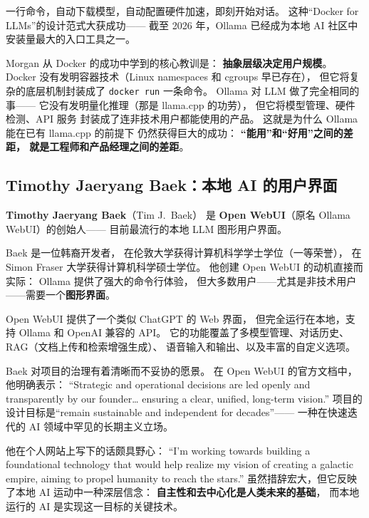 一行命令，自动下载模型，自动配置硬件加速，即刻开始对话。
这种``Docker for LLMs''的设计范式大获成功——
截至 2026 年，Ollama 已经成为本地 AI 社区中
安装量最大的入口工具之一。

\begin{whybox}
Morgan 从 Docker 的成功中学到的核心教训是：
\textbf{抽象层级决定用户规模}。
Docker 没有发明容器技术（Linux namespaces 和 cgroups 早已存在），
但它将复杂的底层机制封装成了 \texttt{docker run} 一条命令。
Ollama 对 LLM 做了完全相同的事——
它没有发明量化推理（那是 llama.cpp 的功劳），
但它将模型管理、硬件检测、API 服务
封装成了连非技术用户都能使用的产品。
这就是为什么 Ollama 能在已有 llama.cpp 的前提下
仍然获得巨大的成功：
\textbf{``能用''和``好用''之间的差距，
就是工程师和产品经理之间的差距}。
\end{whybox}


\subsection{Timothy Jaeryang Baek：本地 AI 的用户界面}
\label{subsec:baek}

\textbf{Timothy Jaeryang Baek}（Tim J.\ Baek）
是 \textbf{Open WebUI}（原名 Ollama WebUI）的创始人——
目前最流行的本地 LLM 图形用户界面。

Baek 是一位韩裔开发者，
在伦敦大学获得计算机科学学士学位（一等荣誉），
在 Simon Fraser 大学获得计算机科学硕士学位。
他创建 Open WebUI 的动机直接而实际：
Ollama 提供了强大的命令行体验，
但大多数用户——尤其是非技术用户——需要一个\textbf{图形界面}。

Open WebUI 提供了一个类似 ChatGPT 的 Web 界面，
但完全运行在本地，支持 Ollama 和 OpenAI 兼容的 API。
它的功能覆盖了多模型管理、对话历史、
RAG（文档上传和检索增强生成）、
语音输入和输出、以及丰富的自定义选项。

Baek 对项目的治理有着清晰而不妥协的愿景。
在 Open WebUI 的官方文档中，他明确表示：
``Strategic and operational decisions are led openly and transparently
by our founder\ldots{} ensuring a clear, unified, long-term vision.''
项目的设计目标是``remain sustainable and independent for decades''——
一种在快速迭代的 AI 领域中罕见的长期主义立场。

他在个人网站上写下的话颇具野心：
``I'm working towards building a foundational technology
that would help realize my vision of creating a galactic empire,
aiming to propel humanity to reach the stars.''
虽然措辞宏大，但它反映了本地 AI 运动中一种深层信念：
\textbf{自主性和去中心化是人类未来的基础}，
而本地运行的 AI 是实现这一目标的关键技术。


